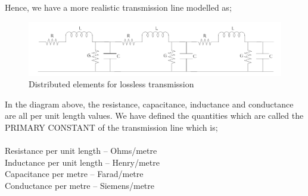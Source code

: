 Hence, we have a more realistic transmission line modelled as;\\
\begin{figure}[h]
\centering
\includegraphics[width=1\linewidth]{./graphics/sixth}
\caption{Distributed elements for lossless transmission}
\end{figure}
In the diagram above, the resistance, capacitance, inductance and conductance are all per unit length values. We have defined the quantities which are called the PRIMARY CONSTANT of the transmission line which is;\\\\
Resistance per unit length – Ohms/metre\\
Inductance per unit length – Henry/metre\\
Capacitance per metre – Farad/metre\\
Conductance per metre – Siemens/metre\\

